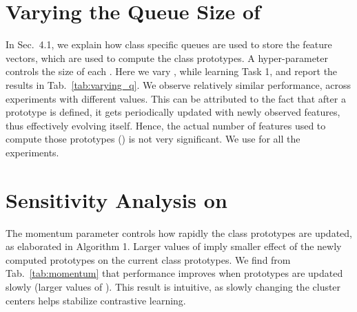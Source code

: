 \documentclass[final]{cvpr}
\begin{document}
\section{Varying the Queue Size of }
In Sec.~4.1, we explain how class specific queues  are used to store the feature vectors, which are used to compute the class prototypes. A hyper-parameter  controls the size of each . Here we vary , while learning Task 1, and report the results in Tab.~\ref{tab:varying_q}. We observe relatively similar performance, across experiments with different  values. This can be attributed to the fact that after a prototype is defined, it gets periodically updated with newly observed features, thus effectively evolving itself. Hence, the actual number of features used to compute those prototypes () is not very significant. We use  for all the experiments.

\begin{table}[h]
\centering
{}
\caption{We find that varying the number of features that are used to compute the class prototype does not have a huge impact on the performance. }
\label{tab:varying_q}
\end{table}

\section{Sensitivity Analysis on }
The momentum parameter  controls how rapidly the class prototypes are updated, as elaborated in Algorithm 1. Larger values of  imply smaller effect of the newly computed prototypes on the current class prototypes. We find from Tab.~\ref{tab:momentum} that performance improves when prototypes are updated slowly (larger values of ). This result is intuitive, as slowly changing the cluster centers helps stabilize contrastive learning.  

\begin{table}[h]
\centering
{}
\caption{We see that higher values of  gives better performance, implying that gradual evolution of class prototypes improves contrastive clustering.}
\label{tab:momentum}
\end{table}
\end{document}

